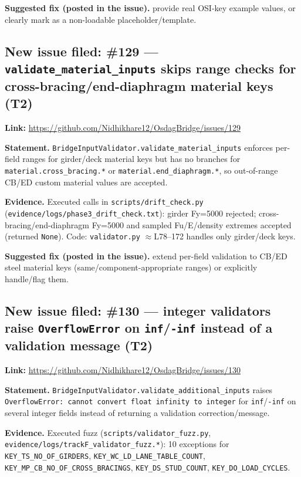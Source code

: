\documentclass[11pt,a4paper]{article}
\begin{document}
\textbf{Suggested fix (posted in the issue).} provide real OSI-key example values, or clearly mark as a non-loadable placeholder/template.

\subsection{New issue filed: \#129 --- \texttt{validate\_material\_inputs} skips range checks for cross-bracing/end-diaphragm material keys (T2)}
\textbf{Link:} \url{https://github.com/Nidhikhare12/OsdagBridge/issues/129}

\textbf{Statement.} \texttt{BridgeInputValidator.validate\_material\_inputs} enforces per-field ranges for girder/deck material keys but has no branches for \texttt{material.cross\_bracing.*} or \texttt{material.end\_diaphragm.*}, so out-of-range CB/ED custom material values are accepted.

\textbf{Evidence.} Executed calls in \texttt{scripts/drift\_check.py} (\texttt{evidence/logs/phase3\_drift\_check.txt}): girder Fy=5000 rejected; cross-bracing/end-diaphragm Fy=5000 and sampled Fu/E/density extremes accepted (returned \texttt{None}). Code: \texttt{validator.py} $\approx$L78--172 handles only girder/deck keys.

\textbf{Suggested fix (posted in the issue).} extend per-field validation to CB/ED steel material keys (same/component-appropriate ranges) or explicitly handle/flag them.

\subsection{New issue filed: \#130 --- integer validators raise \texttt{OverflowError} on \texttt{inf}/\texttt{-inf} instead of a validation message (T2)}
\textbf{Link:} \url{https://github.com/Nidhikhare12/OsdagBridge/issues/130}

\textbf{Statement.} \texttt{BridgeInputValidator.validate\_additional\_inputs} raises \texttt{OverflowError: cannot convert float infinity to integer} for \texttt{inf}/\texttt{-inf} on several integer fields instead of returning a validation correction/message.

\textbf{Evidence.} Executed fuzz (\texttt{scripts/validator\_fuzz.py}, \texttt{evidence/logs/trackF\_validator\_fuzz.*}): 10 exceptions for \texttt{KEY\_TS\_NO\_OF\_GIRDERS}, \texttt{KEY\_WC\_LD\_LANE\_TABLE\_COUNT}, \texttt{KEY\_MP\_CB\_NO\_OF\_CROSS\_BRACINGS}, \texttt{KEY\_DS\_STUD\_COUNT}, \texttt{KEY\_DO\_LOAD\_CYCLES}.
\end{document}
